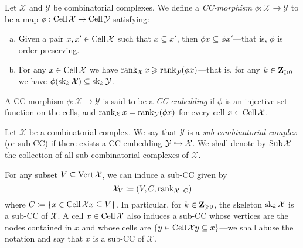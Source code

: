 \begin{definition}
    \label{def:cc-morphism}
    Let \(\mathcal{X}\) and \(\mathcal{Y}\) be combinatorial complexes. We define a \emph{CC-morphism}
    \(\phi: \mathcal{X} \to \mathcal{Y}\) to be a map \(\phi: \operatorname{Cell} \mathcal{X} \to \operatorname{Cell} \mathcal{Y}\) satisfying:
    \begin{enumerate}[(a)]\setlength\itemsep{0em}
        \item Given a pair \(x, x' \in \operatorname{Cell} \mathcal{X}\) such that \(x \subseteq x'\), then \(\phi x \subseteq \phi
              x'\)---that is, \(\phi\) is order preserving.
        \item For any \(x \in \operatorname{Cell} \mathcal{X}\) we have
              \(\operatorname{rank}_{\mathcal{X}} x \geqslant \operatorname{rank}_{\mathcal{Y}}(\phi x)\)---that is, for any
              \(k \in \mathbf{Z}_{\geqslant 0}\) we have \(\phi(\operatorname{sk}_k \mathcal{X}) \subseteq \operatorname{sk}_k \mathcal{Y}\).
    \end{enumerate}
\end{definition}

\begin{definition}
    \label{def:cc-embedding}
    A CC-morphism \(\phi: \mathcal{X} \to \mathcal{Y}\) is said to be a \emph{CC-embedding} if
    \(\phi\) is an injective set function on the cells, and
    \(\operatorname{rank}_{\mathcal{X}} x = \operatorname{rank}_{\mathcal{Y}}(\phi x)\) for every cell \(x \in \operatorname{Cell} \mathcal{X}\).
\end{definition}

\begin{definition}
    \label{def:sub-combinatorial-complex}
    Let \(\mathcal{X}\) be a combinatorial complex. We say that \(\mathcal{Y}\) is a
    \emph{sub-combinatorial complex} (or sub-CC) if there exists a CC-embedding
    \(\mathcal{Y} \hookrightarrow \mathcal{X}\). We shall denote by \(\operatorname{Sub} \mathcal{X}\) the collection of all
    sub-combinatorial complexes of \(\mathcal{X}\).
\end{definition}

\begin{example}
    \label{exp:sub-cc}
    For any subset \(V \subseteq \operatorname{Vert} \mathcal{X}\), we can induce a sub-CC given by
    \[
        \mathcal{X}_V \coloneq (V, C, \operatorname{rank}_{\mathcal{X}}|_C)
    \]
    where \(C \coloneq \{x \in \operatorname{Cell} \mathcal{X} \relax x \subseteq V\}\). In particular, for
    \(k \in \mathbf{Z}_{\geqslant 0}\), the skeleton \(\operatorname{sk}_k \mathcal{X}\) is a sub-CC of \(\mathcal{X}\). A cell \(x \in
    \operatorname{Cell} \mathcal{X}\) also induces a sub-CC whose vertices are the nodes contained in \(x\)
    and whose cells are \(\{y \in \operatorname{Cell} \mathcal{X} \relax y \subseteq x\}\)---we shall abuse the notation
    and say that \(x\) is a sub-CC of \(\mathcal{X}\).
\end{example}

